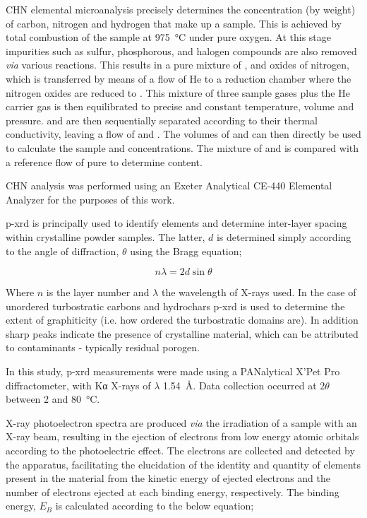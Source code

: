 CHN elemental microanalysis precisely determines the concentration (by weight) of carbon, nitrogen and hydrogen that make up a sample. This is achieved by total combustion of the sample at \qty{975}{\degreeCelsius} under pure oxygen. At this stage impurities such as sulfur, phosphorous, and halogen compounds are also removed \textit{via} various reactions. This results in a pure mixture of ,  and oxides of nitrogen, which is transferred by means of a flow of He to a reduction chamber where the nitrogen oxides are reduced to . This mixture of three sample gases plus the He carrier gas is then equilibrated to precise and constant temperature, volume and pressure.  and  are then sequentially separated according to their thermal conductivity, leaving a flow of  and . The volumes of  and  can then directly be used to calculate the sample  and  concentrations. The mixture of  and  is compared with a reference flow of pure  to determine  content.

CHN analysis was performed using an Exeter Analytical CE-440 Elemental Analyzer for the purposes of this work.

\acrfull{p-xrd} is principally used to identify elements and determine inter-layer spacing within crystalline powder samples. The latter, $d$ is determined simply according to the angle of diffraction, $\theta$ using the Bragg equation;

\begin{equation}
    n\lambda = 2 d \sin{\theta}
\end{equation}

Where $n$ is the layer number and $\lambda$ the wavelength of X-rays used.\citep{woolfson1997introduction} In the case of unordered \glspl{turbostratic carbon} and \glspl{hydrochar} \acrshort{p-xrd} is used to determine the extent of graphiticity (i.e. how ordered the turbostratic domains are). In addition sharp peaks indicate the presence of crystalline material, which can be attributed to contaminants - typically residual \gls{porogen}.

In this study, \acrshort{p-xrd} measurements were made using a PANalytical X’Pet Pro diffractometer, with K\textgreek{α} X-rays of $\lambda$ \qty{1.54}{\angstrom}. Data collection occurred at $2\theta$ between \num{2} and \qty{80}{\degreeCelsius}.

X-ray photoelectron spectra are produced \textit{via} the irradiation of a sample with an X-ray beam, resulting in the ejection of electrons from low energy atomic orbitals according to the photoelectric effect\citep{richardson1912liii}. The electrons are collected and detected by the apparatus, facilitating the elucidation of the identity and quantity of elements present in the material from the kinetic energy of ejected electrons and the number of electrons ejected at each binding energy, respectively. The binding energy, $E_B$ is calculated according to the below equation;

